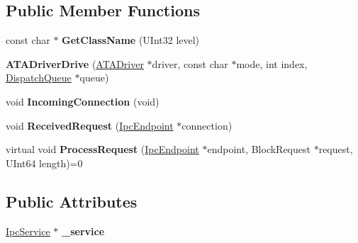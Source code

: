 \subsection*{Public Member Functions}
\begin{DoxyCompactItemize}
\item 
\mbox{\label{class_a_t_a_driver_drive_a2dff4ce26285788b53eca58d90805377}} 
const char $\ast$ {\bfseries Get\+Class\+Name} (U\+Int32 level)
\item 
\mbox{\label{class_a_t_a_driver_drive_a2285e89405b4ee1713f33764a8dc7a6f}} 
{\bfseries A\+T\+A\+Driver\+Drive} (\hyperlink{class_a_t_a_driver}{A\+T\+A\+Driver} $\ast$driver, const char $\ast$mode, int index, \hyperlink{class_dispatch_queue}{Dispatch\+Queue} $\ast$queue)
\item 
\mbox{\label{class_a_t_a_driver_drive_adec8a8a45d54b04b934b83635ab7c024}} 
void {\bfseries Incoming\+Connection} (void)
\item 
\mbox{\label{class_a_t_a_driver_drive_a320e2ce5cb415ca2774e09599594ded7}} 
void {\bfseries Received\+Request} (\hyperlink{class_ipc_endpoint}{Ipc\+Endpoint} $\ast$connection)
\item 
\mbox{\label{class_a_t_a_driver_drive_a6634cf8a9efd443ca199418eb4206a27}} 
virtual void {\bfseries Process\+Request} (\hyperlink{class_ipc_endpoint}{Ipc\+Endpoint} $\ast$endpoint, Block\+Request $\ast$request, U\+Int64 length)=0
\end{DoxyCompactItemize}
\subsection*{Public Attributes}
\begin{DoxyCompactItemize}
\item 
\mbox{\label{class_a_t_a_driver_drive_af6e820666a196d72e551110840d97556}} 
\hyperlink{class_ipc_service}{Ipc\+Service} $\ast$ {\bfseries \+\_\+service}
\end{DoxyCompactItemize}
